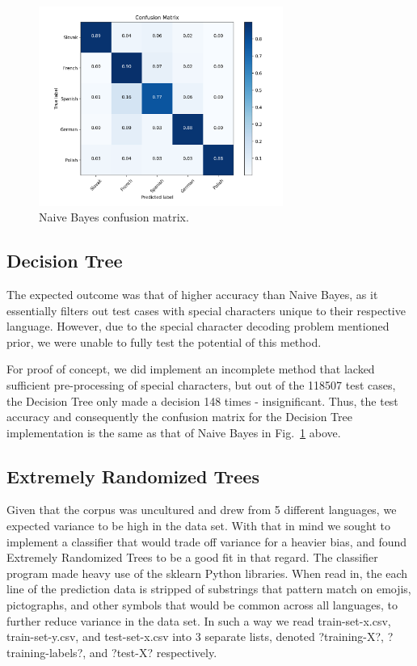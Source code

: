 \documentclass[conference]{IEEEtran}
\begin{document}
\begin{figure}[htbp]
\centering
\includegraphics[width=80mm]{confusion_bayes.png}
\caption{Naive Bayes confusion matrix.}
\label{confusion_bayes}
\end{figure}

\subsection{Decision Tree}
The expected outcome was that of higher accuracy than Naive Bayes, as it essentially filters out test cases with special characters unique to their respective language. However, due to the special character decoding problem mentioned prior, we were unable to fully test the potential of this method.

For proof of concept, we did implement an incomplete method that lacked sufficient pre-processing of special characters, but out of the 118507 test cases, the Decision Tree only made a decision 148 times - insignificant. Thus, the test accuracy and consequently the confusion matrix for the Decision Tree implementation is the same as that of Naive Bayes in Fig.~\ref{confusion_bayes} above.



\subsection{Extremely Randomized Trees}
Given that the corpus was uncultured and drew from 5 different languages, we expected variance to be high in the data set. With that in mind we sought to implement a classifier that would trade off variance for a heavier bias, and found Extremely Randomized Trees to be a good fit in that regard. The classifier program made heavy use of the sklearn Python libraries. When read in, the each line of the prediction data is stripped of substrings that pattern match on emojis, pictographs, and other symbols that would be common across all languages, to further reduce variance in the data set. In such a way we read train-set-x.csv, train-set-y.csv, and test-set-x.csv into 3 separate lists, denoted ?training-X?, ?training-labels?, and ?test-X? respectively.
\end{document}
